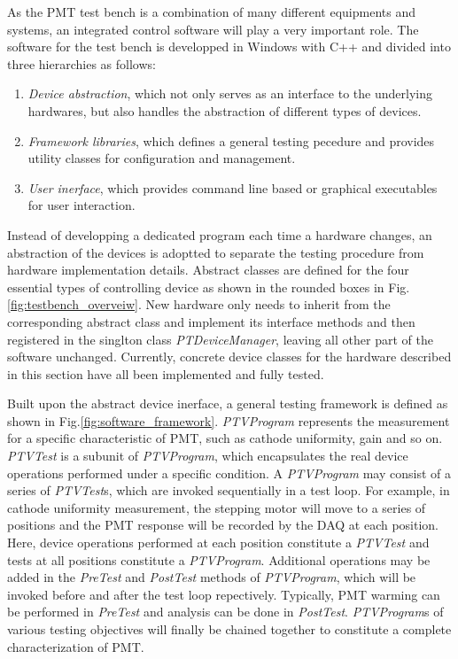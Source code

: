 \documentclass[5p, times]{elsarticle}
\begin{document}
As the PMT test bench is a combination of many different equipments and systems, an integrated control software will play a very important role. 
The software for the test bench is developped in Windows with C++ and divided into three hierarchies as follows:
\begin{enumerate}
 \item \textit{Device abstraction}, which not only serves as an interface to the underlying hardwares, but also handles the abstraction of different types of devices. 
 \item \textit{Framework libraries}, which defines a general testing pecedure and provides utility classes for configuration and management.
 \item \textit{User inerface}, which provides command line based or graphical executables for user interaction. 
\end{enumerate}

Instead of developping a dedicated program each time a hardware changes, an abstraction of the devices is adoptted to separate the testing procedure from hardware implementation details. 
Abstract classes are defined for the four essential types of controlling device as shown in the rounded boxes in Fig.\ref{fig:testbench_overveiw}.
New hardware only needs to inherit from the corresponding abstract class and implement its interface methods and then registered in the singlton class \textit{PTDeviceManager}, leaving all other part of the software unchanged.
Currently, concrete device classes for the hardware described in this section have all been implemented and fully tested.

Built upon the abstract device inerface, a general testing framework is defined as shown in Fig.\ref{fig:software_framework}.
\textit{PTVProgram} represents the measurement for a specific characteristic of PMT, such as cathode uniformity, gain and so on.
\textit{PTVTest} is a subunit of \textit{PTVProgram}, which encapsulates the real device operations performed under a specific condition.
A \textit{PTVProgram} may consist of a series of \textit{PTVTest}s, which are invoked sequentially in a test loop.
For example, in cathode uniformity measurement, the stepping motor will move to a series of positions and the PMT response will be recorded by the DAQ at each position.
Here, device operations performed at each position constitute a \textit{PTVTest} and tests at all positions constitute a \textit{PTVProgram}.
Additional operations may be added in the \textit{PreTest} and \textit{PostTest} methods of \textit{PTVProgram}, which will be invoked before and after the test loop repectively.
Typically, PMT warming can be performed in \textit{PreTest} and analysis can be done in \textit{PostTest}.
\textit{PTVProgram}s of various testing objectives will finally be chained together to constitute a complete characterization of PMT.
\end{document}
